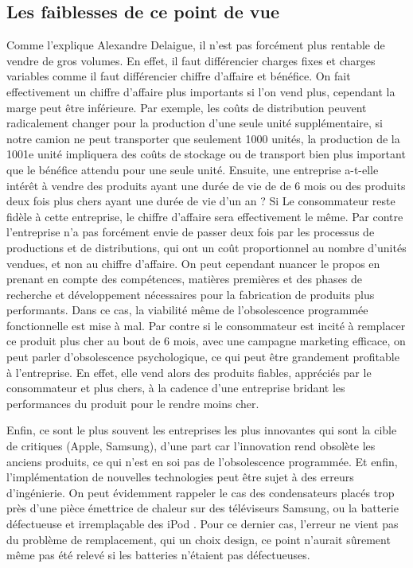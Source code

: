 \subsection{Les faiblesses de ce point de vue}


Comme l’explique Alexandre Delaigue, il n’est pas forcément plus rentable de vendre de gros volumes. En effet, il faut différencier charges fixes et charges variables comme il faut différencier chiffre d’affaire et bénéfice. On fait effectivement un chiffre d’affaire plus importants si l’on vend plus, cependant la marge peut être inférieure. Par exemple, les coûts de distribution peuvent radicalement changer pour la production d’une seule unité supplémentaire, si notre camion ne peut transporter que seulement  1000 unités,  la production de la 1001e unité impliquera des coûts de stockage ou de transport bien plus important que le bénéfice attendu pour une seule unité. Ensuite, une entreprise a-t-elle intérêt à vendre des produits ayant une durée de vie de de 6 mois ou des produits deux fois plus chers ayant une durée de vie d’un an ? Si Le consommateur reste fidèle à cette entreprise, le chiffre d’affaire sera effectivement le même. Par contre l’entreprise n’a pas forcément envie de passer deux fois par les processus de productions et de distributions, qui ont un coût proportionnel au nombre d’unités vendues, et non au chiffre d’affaire. On peut cependant nuancer le propos en prenant en compte des compétences, matières premières  et des phases de recherche et développement nécessaires pour la fabrication de produits plus performants. Dans ce cas, la viabilité même de l’obsolescence programmée fonctionnelle est mise à mal. Par contre si le consommateur est incité à remplacer ce produit plus cher au bout de 6 mois, avec une campagne marketing efficace, on peut parler d’obsolescence psychologique, ce qui peut être grandement  profitable à l’entreprise. En effet, elle vend alors des produits fiables, appréciés par le consommateur et plus chers, à la cadence d’une entreprise bridant les performances du produit pour le rendre moins cher.

\bigbreak
Enfin, ce sont le plus souvent les entreprises les plus innovantes qui sont la cible de critiques (Apple, Samsung), d’une part car l’innovation rend obsolète les anciens produits, ce qui n’est en soi pas de l’obsolescence programmée. Et enfin, l’implémentation de nouvelles technologies peut être sujet à des erreurs d’ingénierie. On peut évidemment rappeler le cas des condensateurs placés trop près d’une pièce émettrice de  chaleur sur des téléviseurs Samsung, ou la batterie défectueuse et irremplaçable des iPod . Pour ce dernier cas, l’erreur ne vient pas du problème de remplacement, qui un choix design, ce point n’aurait sûrement même pas été relevé si les batteries n’étaient pas défectueuses.
